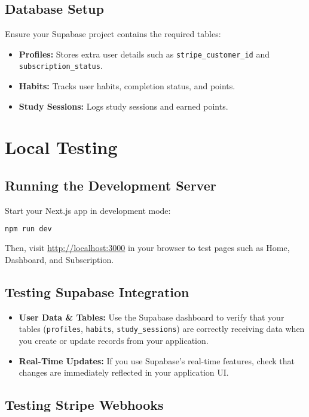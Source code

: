 \documentclass[11pt]{article}
\begin{document}
\subsection{Database Setup}
Ensure your Supabase project contains the required tables:
\begin{itemize}[leftmargin=*]
    \item \textbf{Profiles:} Stores extra user details such as \texttt{stripe\_customer\_id} and \texttt{subscription\_status}.
    \item \textbf{Habits:} Tracks user habits, completion status, and points.
    \item \textbf{Study Sessions:} Logs study sessions and earned points.
\end{itemize}

\section{Local Testing}

\subsection{Running the Development Server}
Start your Next.js app in development mode:
\begin{lstlisting}[language=bash]
npm run dev
\end{lstlisting}
Then, visit \url{http://localhost:3000} in your browser to test pages such as Home, Dashboard, and Subscription.

\subsection{Testing Supabase Integration}
\begin{itemize}[leftmargin=*]
    \item \textbf{User Data \& Tables:} Use the Supabase dashboard to verify that your tables (\texttt{profiles}, \texttt{habits}, \texttt{study\_sessions}) are correctly receiving data when you create or update records from your application.
    \item \textbf{Real-Time Updates:} If you use Supabase's real-time features, check that changes are immediately reflected in your application UI.
\end{itemize}

\subsection{Testing Stripe Webhooks}
\end{document}
